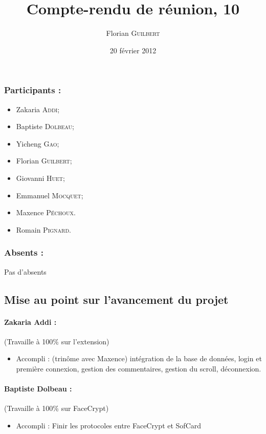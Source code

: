 \documentclass[a4paper,10pt]{article}
\author{Florian \textsc{Guilbert}}
\title{Compte-rendu de réunion, 10}
\date{20 février 2012}
\begin{document}
\maketitle

\subsubsection*{Participants : }
\begin{itemize}
    \item Zakaria \textsc{Addi};
    \item Baptiste \textsc{Dolbeau};
    \item Yicheng \textsc{Gao};
    \item Florian \textsc{Guilbert};
    \item Giovanni \textsc{Huet};
    \item Emmanuel \textsc{Mocquet};
    \item Maxence  \textsc{Péchoux}.
    \item Romain \textsc{Pignard}.
\end{itemize}

\subsubsection*{Absents : }
Pas d'absents

\subsection*{Mise au point sur l'avancement du projet}

\paragraph{Zakaria Addi :} (Travaille à 100\% sur l'extension)\\
\begin{itemize}
    \item Accompli : (trinôme avec Maxence) intégration de la 
    base de données, login et première connexion, gestion des commentaires,
    gestion du scroll, déconnexion.
\end{itemize}

\paragraph{Baptiste Dolbeau :} (Travaille à 100\% sur FaceCrypt)
\begin{itemize}
\item Accompli : Finir les protocoles entre FaceCrypt et SofCard
\end{itemize}
\end{document}
